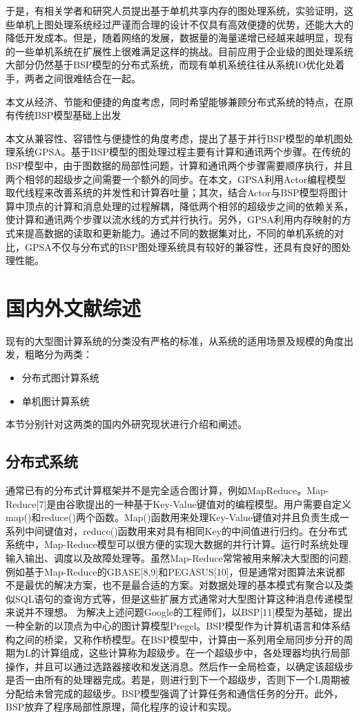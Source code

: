 于是，有相关学者和研究人员提出基于单机共享内存的图处理系统，实验证明，这些单机上图处理系统经过严谨而合理的设计不仅具有高效便捷的优势，还能大大的降低开发成本。但是，随着网络的发展，数据量的海量递增已经越来越明显，现有的一些单机系统在扩展性上很难满足这样的挑战。目前应用于企业级的图处理系统大部分仍然基于BSP模型的分布式系统，而现有单机系统往往从系统IO优化处着手，两者之间很难结合在一起。

本文从经济、节能和便捷的角度考虑，同时希望能够兼顾分布式系统的特点，在原有传统BSP模型基础上出发

本文从兼容性、容错性与便捷性的角度考虑，提出了基于并行BSP模型的单机图处理系统GPSA。基于BSP模型的图处理过程主要有计算和通讯两个步骤。在传统的BSP模型中，由于图数据的局部性问题，计算和通讯两个步骤需要顺序执行，并且两个相邻的超级步之间需要一个额外的同步。在本文，GPSA利用Actor编程模型取代线程来改善系统的并发性和计算吞吐量；其次，结合Actor与BSP模型将图计算中顶点的计算和消息处理的过程解耦，降低两个相邻的超级步之间的依赖关系，使计算和通讯两个步骤以流水线的方式并行执行。另外，GPSA利用内存映射的方式来提高数据的读取和更新能力。通过不同的数据集对比，不同的单机系统的对比，GPSA不仅与分布式的BSP图处理系统具有较好的兼容性，还具有良好的图处理性能。

\section{国内外文献综述}
现有的大型图计算系统的分类没有严格的标准，从系统的适用场景及规模的角度出发，粗略分为两类：
\begin{itemize}
\item 分布式图计算系统
\item 单机图计算系统
\end{itemize}
本节分别针对这两类的国内外研究现状进行介绍和阐述。

\subsection{分布式系统}
通常已有的分布式计算框架并不是完全适合图计算，例如MapReduce。Map-Reduce[7]是由谷歌提出的一种基于Key-Value键值对的编程模型。用户需要自定义map()和reduce()两个函数。Map()函数用来处理Key-Value键值对并且负责生成一系列中间键值对，reduce()函数用来对具有相同Key的中间值进行归约。在分布式系统中，Map-Reduce模型可以很方便的实现大数据的并行计算。运行时系统处理输入输出、调度以及故障处理等。虽然Map-Reduce常常被用来解决大型图的问题,例如基于Map-Reduce的GBASE[8,9]和PEGASUS[10]，但是通常对图算法来说都不是最优的解决方案，也不是最合适的方案。对数据处理的基本模式有聚合以及类似SQL语句的查询方式等，但是这些扩展方式通常对大型图计算这种消息传递模型来说并不理想。
为解决上述问题Google的工程师们，以BSP[11]模型为基础，提出一种全新的以顶点为中心的图计算模型Pregel。BSP模型作为计算机语言和体系结构之间的桥梁，又称作桥模型。在BSP模型中，计算由一系列用全局同步分开的周期为L的计算组成，这些计算称为超级步。在一个超级步中，各处理器均执行局部操作，并且可以通过选路器接收和发送消息。然后作一全局检查，以确定该超级步是否一由所有的处理器完成。若是，则进行到下一个超级步，否则下一个L周期被分配给未曾完成的超级步。BSP模型强调了计算任务和通信任务的分开。此外，BSP放弃了程序局部性原理，简化程序的设计和实现。

